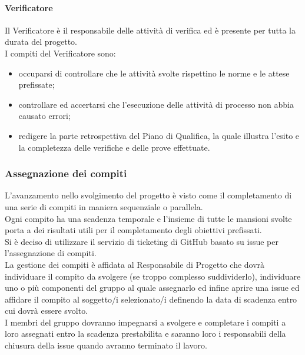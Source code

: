 			\paragraph{Verificatore  }
				Il Verificatore è il responsabile delle attività di verifica ed è presente per tutta la durata del progetto. \\
				I compiti del Verificatore sono:\\
				\begin{itemize}
					\item occuparsi di controllare che le attività svolte rispettino le norme e le attese prefissate;
					\item controllare ed accertarsi che l’esecuzione delle attività di processo non abbia causato errori;
					\item redigere la parte retrospettiva del Piano di Qualifica, la quale illustra l’esito e la completezza delle verifiche e delle prove effettuate.
				\end{itemize}
		\subsubsection{Assegnazione dei compiti}
			L’avanzamento nello svolgimento del progetto è visto come il completamento di una serie di compiti in maniera sequenziale o parallela. \\
			Ogni compito ha una scadenza temporale e l’insieme di tutte le mansioni svolte porta a dei risultati utili per il completamento degli obiettivi prefissati.\\
			Si è deciso di utilizzare il servizio di ticketing di GitHub basato su issue per l’assegnazione di compiti.\\
			La gestione dei compiti è affidata al Responsabile di Progetto che dovrà individuare il compito da svolgere (se troppo complesso suddividerlo), individuare uno o più componenti del gruppo al quale assegnarlo ed infine aprire una issue ed affidare il compito al soggetto/i selezionato/i definendo la data di scadenza entro cui dovrà essere svolto.\\
			I membri del gruppo dovranno impegnarsi a svolgere e completare i compiti a loro assegnati entro la scadenza prestabilita e saranno loro i responsabili della chiusura della issue quando avranno terminato il lavoro.\\
